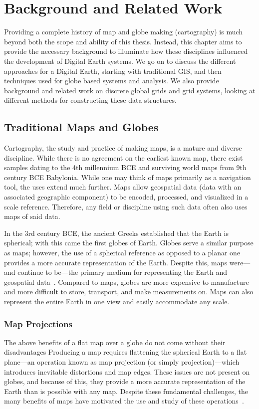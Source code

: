 \chapter{Background and Related Work} \label{chap:background}
Providing a complete history of map and globe making (cartography) is much beyond both the scope and ability of this thesis.
Instead, this chapter aims to provide the necessary background to illuminate how these disciplines influenced the development of Digital Earth systems.
We go on to discuss the different approaches for a Digital Earth, starting with traditional GIS, and then techniques used for globe based systems and analysis.
We also provide background and related work on discrete global grids and grid systems, looking at different methods for constructing these data structures.


\section{Traditional Maps and Globes}
Cartography, the study and practice of making maps, is a mature and diverse discipline.
While there is no agreement on the earliest known map, there exist samples dating to the 4th millennium BCE and surviving world maps from 9th century BCE Babylonia.
While one may think of maps primarily as a navigation tool, the uses extend much further.
Maps allow geospatial data (data with an associated geographic component) to be encoded, processed, and visualized in a scale reference.
Therefore, any field or discipline using such data often also uses maps of said data.


In the 3rd century BCE, the ancient Greeks established that the Earth is spherical; with this came the first globes of Earth.
Globes serve a similar purpose as maps; however, the use of a spherical reference as opposed to a planar one provides a more accurate representation of the Earth.
Despite this, maps were---and continue to be---the primary medium for representing the Earth and geospatial data~\cite{hruby20182000}.
Compared to maps, globes are more expensive to manufacture and more difficult to store, transport, and make measurements on.
Maps can also represent the entire Earth in one view and easily accommodate any scale.


\subsection{Map Projections}
The above benefits of a flat map over a globe do not come without their disadvantages
Producing a map requires flattening the spherical Earth to a flat plane---an operation known as map projection (or simply projection)---which introduces inevitable distortions and map edges.
These issues are not present on globes, and because of this, they provide a more accurate representation of the Earth than is possible with any map.
Despite these fundamental challenges, the many benefits of maps have motivated the use and study of these operations~\cite{snyder1987map, snyder1997flattening}.


